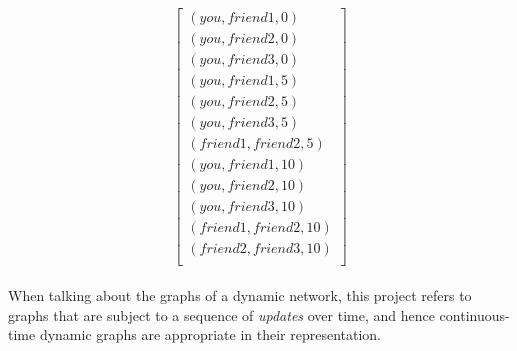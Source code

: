 \begin{equation}
    \begin{bmatrix}
            (you, friend1, 0)\\
            (you, friend2, 0)\\
            (you, friend3, 0)\\
            (you, friend1, 5)\\
            (you, friend2, 5)\\
            (you, friend3, 5)\\
            (friend1, friend2, 5)\\            
            (you, friend1, 10)\\
            (you, friend2, 10)\\
            (you, friend3, 10)\\
            (friend1, friend2, 10)\\
            (friend2, friend3, 10)\\
            \end{bmatrix}
\end{equation}
\\
When talking about the graphs of a dynamic network, this project refers to graphs that are subject to a sequence of \textit{updates} over time, and hence continuous-time dynamic graphs are appropriate in their representation. 




